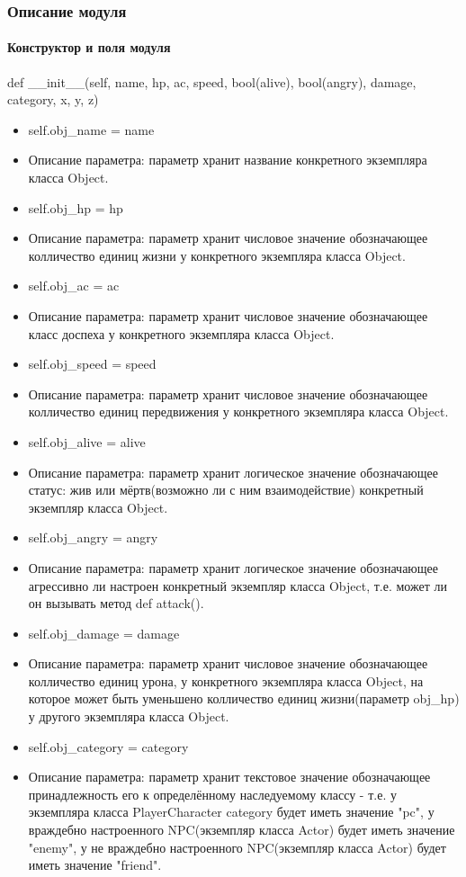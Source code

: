 \subsubsection{Описание модуля}
\paragraph{Конструктор и поля модуля}
def \_\_init\_\_(self, name, hp, ac, speed, bool(alive), bool(angry), damage, category, x, y, z)
\begin{itemize}
	\item self.obj\_name = name 
	\item Описание параметра: параметр хранит название конкретного экземпляра класса Object.
	\item self.obj\_hp = hp 
	\item Описание параметра: параметр хранит числовое значение обозначающее колличество единиц жизни у конкретного экземпляра класса Object.
	\item self.obj\_ac = ac
	\item Описание параметра: параметр хранит числовое значение обозначающее класс доспеха у конкретного экземпляра класса Object.
	\item self.obj\_speed = speed 
	\item Описание параметра: параметр хранит числовое значение обозначающее колличество единиц передвижения у конкретного экземпляра класса Object.
	\item self.obj\_alive = alive 
	\item Описание параметра: параметр хранит логическое значение обозначающее статус: жив или мёртв(возможно ли с ним взаимодействие) конкретный экземпляр класса Object.
	\item self.obj\_angry = angry 
	\item Описание параметра: параметр хранит логическое значение обозначающее агрессивно ли настроен конкретный экземпляр класса Object, т.е. может ли он вызывать метод def attack().
	\item self.obj\_damage = damage
	\item Описание параметра: параметр хранит числовое значение обозначающее колличество единиц урона, у конкретного экземпляра класса Object, на которое может быть уменьшено колличество единиц жизни(параметр obj\_hp) у другого экземпляра класса Object.
	\item self.obj\_category = category 
	\item Описание параметра: параметр хранит текстовое значение обозначающее принадлежность его к определённому наследуемому классу - т.е. у экземпляра класса PlayerCharacter category будет иметь значение "pc", у враждебно настроенного NPC(экземпляр класса Actor) будет иметь значение "enemy", у не враждебно настроенного NPC(экземпляр класса Actor) будет иметь значение "friend".

\end{itemize}
